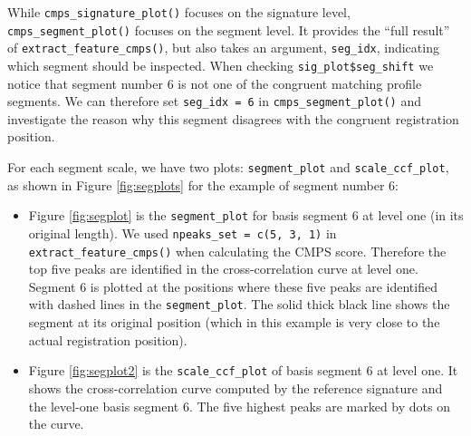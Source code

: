 While \texttt{cmps\_signature\_plot()} focuses on the signature level,
\texttt{cmps\_segment\_plot()} focuses on the segment level. It provides
the ``full result'' of \texttt{extract\_feature\_cmps()}, but also takes
an argument, \texttt{seg\_idx}, indicating which segment should be
inspected. When checking \texttt{sig\_plot\$seg\_shift} we notice that
segment number 6 is not one of the congruent matching profile segments.
We can therefore set \texttt{seg\_idx\ =\ 6} in
\texttt{cmps\_segment\_plot()} and investigate the reason why this
segment disagrees with the congruent registration position.

For each segment scale, we have two plots: \texttt{segment\_plot} and
\texttt{scale\_ccf\_plot}, as shown in Figure \ref{fig:segplots} for the
example of segment number 6:

\begin{itemize}
\item
  Figure \ref{fig:segplot} is the \texttt{segment\_plot} for basis
  segment 6 at level one (in its original length). We used
  \texttt{npeaks\_set\ =\ c(5,\ 3,\ 1)} in
  \texttt{extract\_feature\_cmps()} when calculating the CMPS score.
  Therefore the top five peaks are identified in the cross-correlation
  curve at level one. Segment 6 is plotted at the positions where these
  five peaks are identified with dashed lines in the
  \texttt{segment\_plot}. The solid thick black line shows the segment
  at its original position (which in this example is very close to the
  actual registration position).
\item
  Figure \ref{fig:segplot2} is the \texttt{scale\_ccf\_plot} of basis
  segment 6 at level one. It shows the cross-correlation curve computed
  by the reference signature and the level-one basis segment 6. The five
  highest peaks are marked by dots on the curve.
\end{itemize}

